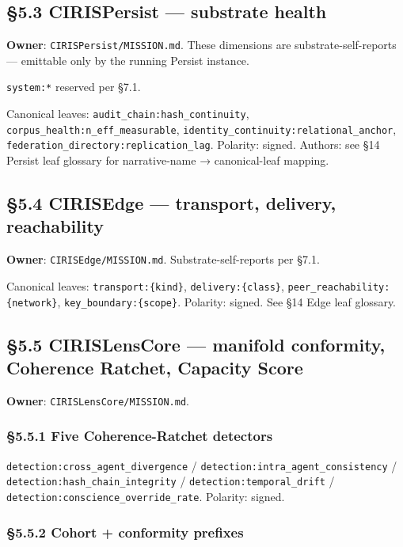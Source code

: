 \documentclass[11pt]{article}
\begin{document}
\subsection*{§5.3 CIRISPersist — substrate health}


\textbf{Owner}: \texttt{CIRISPersist/MISSION.md}. These dimensions are substrate-self-reports — emittable only by the running Persist instance.


\texttt{system:*} reserved per §7.1.


Canonical leaves: \texttt{audit\_chain:hash\_continuity}, \texttt{corpus\_health:n\_eff\_measurable}, \texttt{identity\_continuity:relational\_anchor}, \texttt{federation\_directory:replication\_lag}. Polarity: signed. Authors: see §14 Persist leaf glossary for narrative-name → canonical-leaf mapping.


\subsection*{§5.4 CIRISEdge — transport, delivery, reachability}


\textbf{Owner}: \texttt{CIRISEdge/MISSION.md}. Substrate-self-reports per §7.1.


Canonical leaves: \texttt{transport:\{kind\}}, \texttt{delivery:\{class\}}, \texttt{peer\_reachability:\{network\}}, \texttt{key\_boundary:\{scope\}}. Polarity: signed. See §14 Edge leaf glossary.


\subsection*{§5.5 CIRISLensCore — manifold conformity, Coherence Ratchet, Capacity Score}


\textbf{Owner}: \texttt{CIRISLensCore/MISSION.md}.


\subsubsection*{§5.5.1 Five Coherence-Ratchet detectors}


\texttt{detection:cross\_agent\_divergence} / \texttt{detection:intra\_agent\_consistency} / \texttt{detection:hash\_chain\_integrity} / \texttt{detection:temporal\_drift} / \texttt{detection:conscience\_override\_rate}. Polarity: signed.


\subsubsection*{§5.5.2 Cohort + conformity prefixes}
\end{document}
